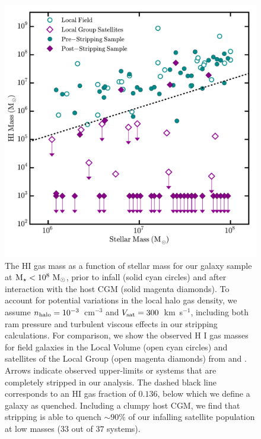 \begin{figure}
 \centering
 \hspace*{-0.2in}
   \includegraphics[width=6in]{underpressure/f7.pdf}
   \caption[H{\scriptsize I} gas mass before and after ram-pressure stripping]{The H{\scriptsize I} gas mass as a function of stellar
     mass for our galaxy sample at ${\rm M}_{\star} < 10^{8}~{\rm M}_{\odot}$, prior to
     infall (solid cyan circles) and after interaction with the host
     CGM (solid magenta diamonds). To account for potential variations
     in the local halo gas density, we assume $n_{\rm halo} =
     10^{-3}$~cm$^{-3}$ and $V_{\rm sat} = 300$~km~s$^{-1}$, including
     both ram pressure and turbulent viscous effects in our stripping
     calculations. For comparison, we show the observed H{\scriptsize
       I} gas masses for field galaxies in the Local Volume (open cyan
     circles) and satellites of the Local Group (open magenta
     diamonds) from \citet{mcconnachie12} and
     \citet{spekkens14}. Arrows indicate observed upper-limits or
     systems that are completely stripped in our analysis. The dashed
     black line corresponds to an H{\scriptsize I} gas fraction of
     $0.136$, below which we define a galaxy as quenched. Including a
     clumpy host CGM, we find that stripping is able to quench
     $\sim90\%$ of our infalling satellite population at low masses
     ($33$ out of $37$ systems).}
 \label{fig:gasfrac}
\end{figure}


